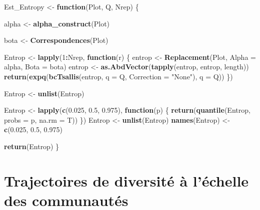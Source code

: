 \documentclass[
  11pt,
  french,
  A4paper,
  extrafontsizes,onecolumn,openright
  ]{memoir}
\newenvironment{Shaded}{\begin{snugshade}}{\end{snugshade}}
\newcommand{\KeywordTok}[1]{\textcolor[rgb]{0.13,0.29,0.53}{\textbf{#1}}}
\newcommand{\DataTypeTok}[1]{\textcolor[rgb]{0.13,0.29,0.53}{#1}}
\newcommand{\DecValTok}[1]{\textcolor[rgb]{0.00,0.00,0.81}{#1}}
\newcommand{\FloatTok}[1]{\textcolor[rgb]{0.00,0.00,0.81}{#1}}
\newcommand{\StringTok}[1]{\textcolor[rgb]{0.31,0.60,0.02}{#1}}
\newcommand{\ControlFlowTok}[1]{\textcolor[rgb]{0.13,0.29,0.53}{\textbf{#1}}}
\newcommand{\OperatorTok}[1]{\textcolor[rgb]{0.81,0.36,0.00}{\textbf{#1}}}
\newcommand{\NormalTok}[1]{#1}
\begin{document}
\begin{Shaded}
\begin{Highlighting}[]
\NormalTok{Est_Entropy <-}\StringTok{ }\ControlFlowTok{function}\NormalTok{(Plot, Q, Nrep) \{}
    
\NormalTok{    alpha <-}\StringTok{ }\KeywordTok{alpha_construct}\NormalTok{(Plot)}
    
\NormalTok{    bota <-}\StringTok{ }\KeywordTok{Correspondences}\NormalTok{(Plot)}
    
\NormalTok{    Entrop <-}\StringTok{ }\KeywordTok{lapply}\NormalTok{(}\DecValTok{1}\OperatorTok{:}\NormalTok{Nrep, }\ControlFlowTok{function}\NormalTok{(r) \{}
\NormalTok{        entrop <-}\StringTok{ }\KeywordTok{Replacement}\NormalTok{(Plot, }\DataTypeTok{Alpha =}\NormalTok{ alpha, }\DataTypeTok{Bota =}\NormalTok{ bota)}
\NormalTok{        entrop <-}\StringTok{ }\KeywordTok{as.AbdVector}\NormalTok{(}\KeywordTok{tapply}\NormalTok{(entrop, entrop, length))}
        \KeywordTok{return}\NormalTok{(}\KeywordTok{expq}\NormalTok{(}\KeywordTok{bcTsallis}\NormalTok{(entrop, }\DataTypeTok{q =}\NormalTok{ Q, }\DataTypeTok{Correction =} \StringTok{"None"}\NormalTok{), }\DataTypeTok{q =}\NormalTok{ Q))}
\NormalTok{    \})}
    
\NormalTok{    Entrop <-}\StringTok{ }\KeywordTok{unlist}\NormalTok{(Entrop)}
    
\NormalTok{    Entrop <-}\StringTok{ }\KeywordTok{lapply}\NormalTok{(}\KeywordTok{c}\NormalTok{(}\FloatTok{0.025}\NormalTok{, }\FloatTok{0.5}\NormalTok{, }\FloatTok{0.975}\NormalTok{), }\ControlFlowTok{function}\NormalTok{(p) \{}
        \KeywordTok{return}\NormalTok{(}\KeywordTok{quantile}\NormalTok{(Entrop, }\DataTypeTok{probs =}\NormalTok{ p, }\DataTypeTok{na.rm =}\NormalTok{ T))}
\NormalTok{    \})}
\NormalTok{    Entrop <-}\StringTok{ }\KeywordTok{unlist}\NormalTok{(Entrop)}
    \KeywordTok{names}\NormalTok{(Entrop) <-}\StringTok{ }\KeywordTok{c}\NormalTok{(}\FloatTok{0.025}\NormalTok{, }\FloatTok{0.5}\NormalTok{, }\FloatTok{0.975}\NormalTok{)}
    
    \KeywordTok{return}\NormalTok{(Entrop)}
\NormalTok{\}}
\end{Highlighting}
\end{Shaded}

\chapter{Trajectoires de diversité à l'échelle des
communautés}\label{trajectoires-de-diversite-a-lechelle-des-communautes}
\end{document}
